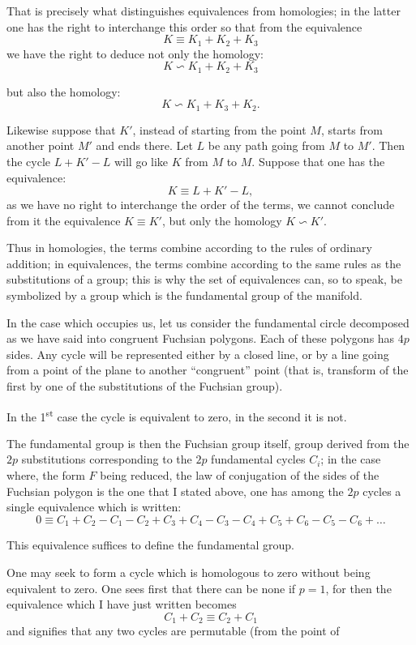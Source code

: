 \documentclass{article}
\begin{document}
That is precisely what distinguishes equivalences from homologies; in the latter one has the right to interchange this order so that from the equivalence
\[ K \equiv K_{1} + K_{2} + K_{3} \]
we have the right to deduce not only the homology:
\[ K \backsim K_{1} + K_{2} + K_{3} \]

but also the homology:
\[ K \backsim K_{1} + K_{3} + K_{2}. \]

Likewise suppose that $K'$, instead of starting from the point $M$, starts from another point $M'$ and ends there. Let $L$ be any path going from $M$ to $M'$. Then the cycle $L + K' - L$ will go like $K$ from $M$ to $M$. Suppose that one has the equivalence:
\[ K \equiv L + K' - L, \]
as we have no right to interchange the order of the terms, we cannot conclude from it the equivalence $K \equiv K'$, but only the homology $K \backsim K'$.

Thus in homologies, the terms combine according to the rules of ordinary addition; in equivalences, the terms combine according to the same rules as the substitutions of a group; this is why the set of equivalences can, so to speak, be symbolized by a group which is the fundamental group of the manifold.

In the case which occupies us, let us consider the fundamental circle decomposed as we have said into congruent Fuchsian polygons. Each of these polygons has $4p$ sides. Any cycle will be represented either by a closed line, or by a line going from a point of the plane to another ``congruent'' point (that is, transform of the first by one of the substitutions of the Fuchsian group).

In the 1\textsuperscript{st} case the cycle is equivalent to zero, in the second it is not.

The fundamental group is then the Fuchsian group itself, group derived from the $2p$ substitutions corresponding to the $2p$ fundamental cycles $C_{i}$; in the case where, the form $F$ being reduced, the law of conjugation of the sides of the Fuchsian polygon is the one that I stated above, one has among the $2p$ cycles a single equivalence which is written:
\[ 0 \equiv C_{1} + C_{2} - C_{1} - C_{2} + C_{3} + C_{4} - C_{3} - C_{4} + C_{5} + C_{6} - C_{5} - C_{6} + \ldots \]

This equivalence suffices to define the fundamental group.

One may seek to form a cycle which is homologous to zero without being equivalent to zero. One sees first that there can be none if $p = 1$, for then the equivalence which I have just written becomes
\[ C_{1} + C_{2} \equiv C_{2} + C_{1} \]
and signifies that any two cycles are permutable (from the point of
\end{document}
